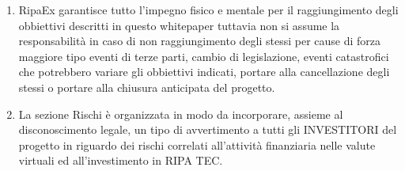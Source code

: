 \documentclass[11pt,fleqn]{book} %
\begin{document}
\begin{scriptsize}
{\begin{enumerate}
			potrebbero aver fatto errore che potrebbero portare ad una perdita finanziaria. Il valore della valuta XPX non è 
			garantito di salire all'infinito ed i termini di riacquisto della valuta sono definiti in questo documento.
			\item RipaEx garantisce tutto l'impegno fisico e mentale per il raggiungimento degli obbiettivi descritti in questo
			whitepaper tuttavia non si assume la responsabilità in caso di non raggiungimento degli stessi per cause di forza maggiore
			tipo eventi di terze parti, cambio di legislazione, eventi catastrofici che potrebbero variare gli obbiettivi indicati,
			portare alla cancellazione degli stessi o portare alla chiusura anticipata del progetto.
			\item La sezione Rischi è organizzata in modo da incorporare, assieme al disconoscimento legale, un tipo di avvertimento
			a tutti gli INVESTITORI del progetto in riguardo dei rischi correlati all'attività finanziaria nelle valute virtuali ed
			all'investimento in RIPA TEC.
		\end{enumerate}		
	}
\end{scriptsize}

\nocite{*}
\printbibliography[title={Riferimenti}]
\newpage
~\vfill
\thispagestyle{empty}
\listoftodos
\end{document}
